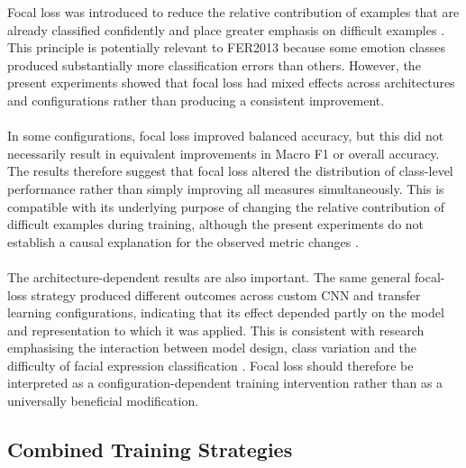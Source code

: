 \documentclass[12pt, a4paper]{report}
\let\oldsubsection\subsection
\renewcommand{\subsection}{%
    \Needspace{6\baselineskip}%
    \oldsubsection
}
\begin{document}
				Focal loss was introduced to reduce the relative contribution of examples that are already classified confidently and place greater emphasis on difficult examples \cite{lin2017focal}. This principle is potentially relevant to FER2013 because some emotion classes produced substantially more classification errors than others. However, the present experiments showed that focal loss had mixed effects across architectures and configurations rather than producing a consistent improvement.\\\\
				In some configurations, focal loss improved balanced accuracy, but this did not necessarily result in equivalent improvements in Macro F1 or overall accuracy. The results therefore suggest that focal loss altered the distribution of class-level performance rather than simply improving all measures simultaneously. This is compatible with its underlying purpose of changing the relative contribution of difficult examples during training, although the present experiments do not establish a causal explanation for the observed metric changes \cite{lin2017focal}.\\\\
				The architecture-dependent results are also important. The same general focal-loss strategy produced different outcomes across custom CNN and transfer learning configurations, indicating that its effect depended partly on the model and representation to which it was applied. This is consistent with research emphasising the interaction between model design, class variation and the difficulty of facial expression classification \cite{Pham2023InterIntraFER, Hunafa2026FERImbalance}. Focal loss should therefore be interpreted as a configuration-dependent training intervention rather than as a universally beneficial modification.
				
			\newpage
			\subsection{Combined Training Strategies}
				
\end{document}
